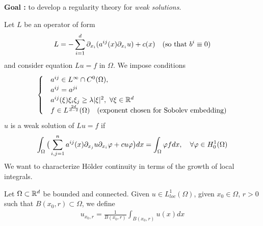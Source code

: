 \documentclass[12pt,a4paper]{article}
\begin{document}
\textbf{Goal :} to develop a regularity theory for \emph{weak solutions}. 
\s

Let $L$ be an operator of form
\begin{align*}
L = -\sum_{i=1}^d \partial_{x_i}(a^{ij}(x) \partial_{x_i} u) + c(x) \quad (\text{so that } b^i \equiv 0)
\end{align*}
and consider equation $Lu = f$ in $\Omega$. We impose conditions
\begin{align*}
\begin{cases}
& a^{ij} \in L^{\infty} \cap C^0(\Omega),\\
& a^{ij}= a^{ji} \\
& a^{ij}(\xi)\xi_i \xi_j \geq \lambda |\xi|^2, \,\, \forall \xi \in \mathbb{R}^d \\
& f\in L^{\frac{2d}{d-2}}(\Omega) \quad (\text{exponent chosen for Sobolev embedding})
\end{cases}
\end{align*}
$u$ is a weak solution of $Lu =f$ if
\begin{align*}
\int_{\Omega} \big( \sum_{i,j=1}^n a^{ij}(x) \partial_{x_j} u \partial_{x_i} \varphi + cu\varphi \big) dx = \int_{\Omega} \varphi f dx, \quad \forall \varphi \in H_0^1(\Omega)
\end{align*}
We want to characterize H\"older continuity in terms of the growth of local integrals.
\s

Let $\Omega \subset \mathbb{R}^d$ be bounded and connected. Given $u\in L^1_{loc}(\Omega)$, given $x_0 \in \Omega$, $r>0$ such that $B(x_0, r) \subset \Omega$, we define
\begin{align*}
u_{x_0, r} = \frac{1}{B(x_0, r)}\int_{B(x_0, r)} u(x) dx
\end{align*}
\s
\end{document}
